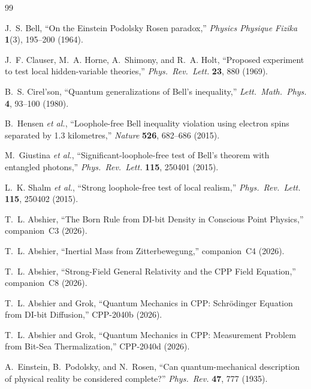 \documentclass[11pt,a4paper]{article}
\begin{document}

\begin{thebibliography}{99}

J.~S. Bell,
``On the Einstein Podolsky Rosen paradox,''
\textit{Physics Physique Fizika} \textbf{1}(3), 195--200 (1964).

J.~F. Clauser, M.~A. Horne, A.~Shimony, and R.~A. Holt,
``Proposed experiment to test local hidden-variable theories,''
\textit{Phys.\ Rev.\ Lett.} \textbf{23}, 880 (1969).

B.~S. Cirel'son,
``Quantum generalizations of Bell's inequality,''
\textit{Lett.\ Math.\ Phys.} \textbf{4}, 93--100 (1980).

B.~Hensen \textit{et al.},
``Loophole-free Bell inequality violation using electron spins
separated by 1.3 kilometres,''
\textit{Nature} \textbf{526}, 682--686 (2015).

M.~Giustina \textit{et al.},
``Significant-loophole-free test of Bell's theorem with entangled photons,''
\textit{Phys.\ Rev.\ Lett.} \textbf{115}, 250401 (2015).

L.~K. Shalm \textit{et al.},
``Strong loophole-free test of local realism,''
\textit{Phys.\ Rev.\ Lett.} \textbf{115}, 250402 (2015).

T.~L. Abshier,
``The Born Rule from DI-bit Density in Conscious Point Physics,''
companion~C3 (2026).

T.~L. Abshier,
``Inertial Mass from Zitterbewegung,''
companion~C4 (2026).

T.~L. Abshier,
``Strong-Field General Relativity and the CPP Field Equation,''
companion~C8 (2026).

T.~L. Abshier and Grok,
``Quantum Mechanics in CPP: Schr\"{o}dinger Equation from
DI-bit Diffusion,'' CPP-2040b (2026).

T.~L. Abshier and Grok,
``Quantum Mechanics in CPP: Measurement Problem from
Bit-Sea Thermalization,'' CPP-2040d (2026).

A.~Einstein, B.~Podolsky, and N.~Rosen,
``Can quantum-mechanical description of physical reality
be considered complete?''
\textit{Phys.\ Rev.} \textbf{47}, 777 (1935).

\end{thebibliography}

\appendix
\end{document}
